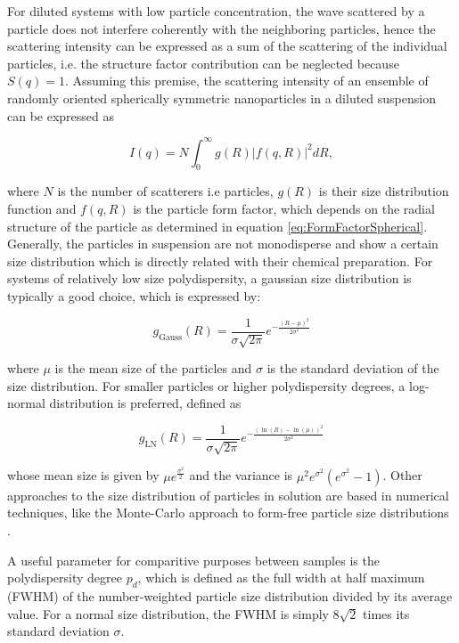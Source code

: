 For diluted systems with low particle concentration, the wave scattered by a particle does not interfere coherently with the neighboring particles, hence the scattering intensity can be expressed as a sum of the scattering of the individual particles, i.e. the structure factor contribution can be neglected because $S(q)=1$\citep{feigin_structure_1987}. Assuming this premise, the scattering intensity of an ensemble of randomly oriented spherically symmetric nanoparticles in a diluted suspension can be expressed as

\begin{equation}
\label{eq:intensity}
I(q)=N\int_{0}^{\infty} g(R)\left|f(q,R) \right|^2 dR,
\end{equation}

where \(N\) is the number of scatterers i.e particles, \(g(R)\) is their size distribution function and \(f(q,R)\) is the particle form factor, which depends on the radial structure of the particle as determined in equation \ref{eq:FormFactorSpherical}. Generally, the particles in suspension are not monodisperse and show a certain size distribution which is directly related with their chemical preparation. For systems of relatively low size polydispersity, a gaussian size distribution is typically a good choice, which is expressed by:

\begin{equation}
        \label{eq:gauss_distribution}
       g_{\text{Gauss}}(R)=\frac{1}{\sigma \sqrt{2\pi}} e^{ - \frac{\left( R - \mu \right)^2}{2\sigma^2} }
\end{equation}

where $\mu$ is the mean size of the particles and $\sigma$ is the standard deviation of the size distribution. For smaller particles or higher polydispersity degrees, a log-normal distribution is preferred, defined as

\begin{equation}
       g_{\text{LN}}(R)=\frac{1}{\sigma \sqrt{2\pi}} e^{ - \frac{\left( \ln(R) - \ln(\mu) \right)^2}{2\sigma^2} }
\end{equation}

whose mean size is given by $\mu e^{\frac{\sigma^2}{2}}$ and the variance is $\mu^2 e^{\sigma^2} (e^{\sigma^2} - 1)$. Other approaches to the size distribution of particles in solution are based in numerical techniques, like the Monte-Carlo approach to form-free particle size distributions \citep{pauw_improvements_2013}.

A useful parameter for comparitive purposes between samples is the polydispersity degree $p_d$, which is defined as the full width at half maximum (FWHM) of the number-weighted particle size distribution divided by its average value. For a normal size distribution, the FWHM is simply $8\sqrt{2}$ times its standard deviation $\sigma$.


